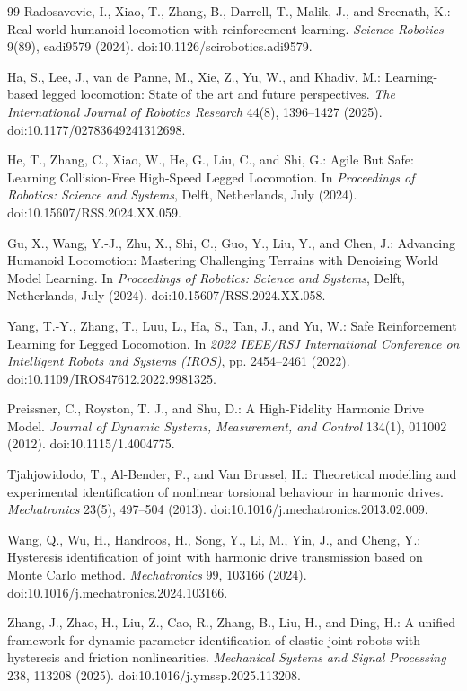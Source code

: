 \documentclass[twoside,final,1p,times]{elsarticle}
\begin{document}
\begin{thebibliography}{99}
Radosavovic, I., Xiao, T., Zhang, B., Darrell, T., Malik, J., and Sreenath, K.: Real-world humanoid locomotion with reinforcement learning.
\emph{Science Robotics} 9(89), eadi9579 (2024). doi:10.1126/scirobotics.adi9579.

Ha, S., Lee, J., van de Panne, M., Xie, Z., Yu, W., and Khadiv, M.: Learning-based legged locomotion: State of the art and future perspectives.
\emph{The International Journal of Robotics Research} 44(8), 1396--1427 (2025). doi:10.1177/02783649241312698.

He, T., Zhang, C., Xiao, W., He, G., Liu, C., and Shi, G.: Agile But Safe: Learning Collision-Free High-Speed Legged Locomotion.
In \emph{Proceedings of Robotics: Science and Systems}, Delft, Netherlands, July (2024). doi:10.15607/RSS.2024.XX.059.

Gu, X., Wang, Y.-J., Zhu, X., Shi, C., Guo, Y., Liu, Y., and Chen, J.: Advancing Humanoid Locomotion: Mastering Challenging Terrains with Denoising World Model Learning.
In \emph{Proceedings of Robotics: Science and Systems}, Delft, Netherlands, July (2024). doi:10.15607/RSS.2024.XX.058.

Yang, T.-Y., Zhang, T., Luu, L., Ha, S., Tan, J., and Yu, W.: Safe Reinforcement Learning for Legged Locomotion.
In \emph{2022 IEEE/RSJ International Conference on Intelligent Robots and Systems (IROS)}, pp. 2454--2461 (2022). doi:10.1109/IROS47612.2022.9981325.

Preissner, C., Royston, T. J., and Shu, D.: A High-Fidelity Harmonic Drive Model.
\emph{Journal of Dynamic Systems, Measurement, and Control} 134(1), 011002 (2012). doi:10.1115/1.4004775.

Tjahjowidodo, T., Al-Bender, F., and Van Brussel, H.: Theoretical modelling and experimental identification of nonlinear torsional behaviour in harmonic drives.
\emph{Mechatronics} 23(5), 497--504 (2013). doi:10.1016/j.mechatronics.2013.02.009.

Wang, Q., Wu, H., Handroos, H., Song, Y., Li, M., Yin, J., and Cheng, Y.: Hysteresis identification of joint with harmonic drive transmission based on Monte Carlo method.
\emph{Mechatronics} 99, 103166 (2024). doi:10.1016/j.mechatronics.2024.103166.

Zhang, J., Zhao, H., Liu, Z., Cao, R., Zhang, B., Liu, H., and Ding, H.: A unified framework for dynamic parameter identification of elastic joint robots with hysteresis and friction nonlinearities.
\emph{Mechanical Systems and Signal Processing} 238, 113208 (2025). doi:10.1016/j.ymssp.2025.113208.


\end{thebibliography}
\end{document}
